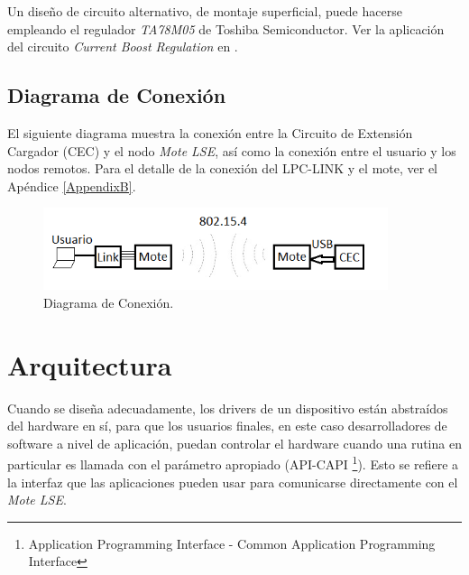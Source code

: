 {Un diseño de circuito alternativo, de montaje superficial, puede hacerse empleando el regulador \textit{TA78M05} de Toshiba Semiconductor. Ver la aplicación del circuito \textit{Current Boost Regulation} en \citep{78M05}.


\subsection{Diagrama de Conexión}
\label{subsec:conexión}
El siguiente diagrama muestra la conexión entre la Circuito de Extensión Cargador 
(CEC) y el nodo \textit{Mote LSE}, así como la conexión entre el usuario y los nodos remotos. Para el detalle de la conexión del LPC-LINK y el mote, ver el Apéndice \ref{AppendixB}.

\vspace{30px}
\begin{figure}[h!]
	\centering
    \includegraphics[width=0.9\textwidth]{./Figures/conex.png}
    	\caption{Diagrama de Conexión.}
	\label{fig:conex}
\end{figure}

\section{Arquitectura}
\label{sec:arq}
Cuando se diseña adecuadamente, los drivers de un dispositivo están abstraídos del hardware en sí, para que los usuarios finales, en este caso desarrolladores de software a nivel de aplicación, puedan controlar el hardware cuando una rutina en particular es llamada con el parámetro apropiado (API-CAPI \footnote{Application Programming Interface - Common Application Programming Interface}). Esto se refiere a la interfaz que las aplicaciones pueden usar para comunicarse directamente con el \textit{Mote LSE}.

}
